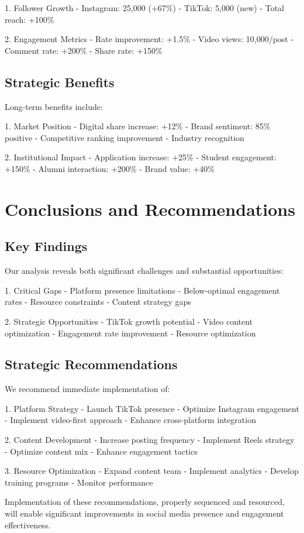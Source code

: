 \documentclass[12pt]{report}
\begin{document}
1. Follower Growth
   - Instagram: 25,000 (+67\%)
   - TikTok: 5,000 (new)
   - Total reach: +100\%

2. Engagement Metrics
   - Rate improvement: +1.5\%
   - Video views: 10,000/post
   - Comment rate: +200\%
   - Share rate: +150\%

\section{Strategic Benefits}

Long-term benefits include:

1. Market Position
   - Digital share increase: +12\%
   - Brand sentiment: 85\% positive
   - Competitive ranking improvement
   - Industry recognition

2. Institutional Impact
   - Application increase: +25\%
   - Student engagement: +150\%
   - Alumni interaction: +200\%
   - Brand value: +40\%

\chapter{Conclusions and Recommendations}

\section{Key Findings}

Our analysis reveals both significant challenges and substantial opportunities:

1. Critical Gaps
   - Platform presence limitations
   - Below-optimal engagement rates
   - Resource constraints
   - Content strategy gaps

2. Strategic Opportunities
   - TikTok growth potential
   - Video content optimization
   - Engagement rate improvement
   - Resource optimization

\section{Strategic Recommendations}

We recommend immediate implementation of:

1. Platform Strategy
   - Launch TikTok presence
   - Optimize Instagram engagement
   - Implement video-first approach
   - Enhance cross-platform integration

2. Content Development
   - Increase posting frequency
   - Implement Reels strategy
   - Optimize content mix
   - Enhance engagement tactics

3. Resource Optimization
   - Expand content team
   - Implement analytics
   - Develop training programs
   - Monitor performance

Implementation of these recommendations, properly sequenced and resourced, will enable significant improvements in social media presence and engagement effectiveness.
\end{document}
